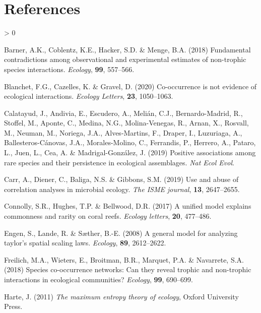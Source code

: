 \documentclass[
]{article}
\newlength{\cslhangindent}
\newenvironment{CSLReferences}[2] %
 {%
  \setlength{\parindent}{0pt}
  \ifodd #1 \everypar{\setlength{\hangindent}{\cslhangindent}}\ignorespaces\fi
  \ifnum #2 > 0
  \setlength{\parskip}{#2\baselineskip}
  \fi
 }%
 {}
\begin{document}
\hypertarget{references}{%
\section*{References}\label{references}}

\hypertarget{refs}{}
\begin{CSLReferences}{1}{0}
\leavevmode\hypertarget{ref-barner2018}{}%
Barner, A.K., Coblentz, K.E., Hacker, S.D. \& Menge, B.A. (2018)
Fundamental contradictions among observational and experimental
estimates of non-trophic species interactions. \emph{Ecology},
\textbf{99}, 557--566.

\leavevmode\hypertarget{ref-blanchet2020}{}%
Blanchet, F.G., Cazelles, K. \& Gravel, D. (2020) Co-occurrence is not
evidence of ecological interactions. \emph{Ecology Letters},
\textbf{23}, 1050--1063.

\leavevmode\hypertarget{ref-calatayud2019}{}%
Calatayud, J., Andivia, E., Escudero, A., Melián, C.J., Bernardo-Madrid,
R., Stoffel, M., Aponte, C., Medina, N.G., Molina-Venegas, R., Arnan,
X., Rosvall, M., Neuman, M., Noriega, J.A., Alves-Martins, F., Draper,
I., Luzuriaga, A., Ballesteros-Cánovas, J.A., Morales-Molino, C.,
Ferrandis, P., Herrero, A., Pataro, L., Juen, L., Cea, A. \&
Madrigal-González, J. (2019) Positive associations among rare species
and their persistence in ecological assemblages. \emph{Nat Ecol Evol}.

\leavevmode\hypertarget{ref-carr2019}{}%
Carr, A., Diener, C., Baliga, N.S. \& Gibbons, S.M. (2019) Use and abuse
of correlation analyses in microbial ecology. \emph{The ISME journal},
\textbf{13}, 2647--2655.

\leavevmode\hypertarget{ref-connolly2017}{}%
Connolly, S.R., Hughes, T.P. \& Bellwood, D.R. (2017) A unified model
explains commonness and rarity on coral reefs. \emph{Ecology letters},
\textbf{20}, 477--486.

\leavevmode\hypertarget{ref-engen2008}{}%
Engen, S., Lande, R. \& Sæther, B.-E. (2008) A general model for
analyzing taylor's spatial scaling laws. \emph{Ecology}, \textbf{89},
2612--2622.

\leavevmode\hypertarget{ref-freilich2018}{}%
Freilich, M.A., Wieters, E., Broitman, B.R., Marquet, P.A. \& Navarrete,
S.A. (2018) Species co-occurrence networks: Can they reveal trophic and
non-trophic interactions in ecological communities? \emph{Ecology},
\textbf{99}, 690--699.

\leavevmode\hypertarget{ref-harte2011}{}%
Harte, J. (2011) \emph{The maximum entropy theory of ecology}, Oxford
University Press.


\end{CSLReferences}
\end{document}

